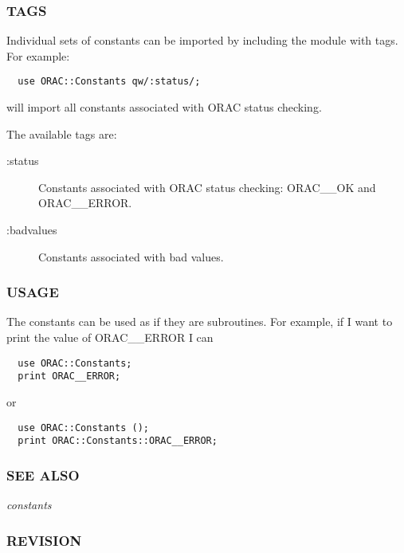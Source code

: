 \subsubsection*{TAGS\label{ORAC::Constants_TAGS}}


Individual sets of constants can be imported by
including the module with tags. For example:

\begin{verbatim}
  use ORAC::Constants qw/:status/;
\end{verbatim}


will import all constants associated with ORAC status checking.



The available tags are:

\begin{description}

\item[{:status}] \mbox{}

Constants associated with ORAC status checking: ORAC\_\_OK and ORAC\_\_ERROR.


\item[{:badvalues}] \mbox{}

Constants associated with bad values.

\end{description}
\subsubsection*{USAGE\label{ORAC::Constants_USAGE}}


The constants can be used as if they are subroutines.
For example, if I want to print the value of ORAC\_\_ERROR I can

\begin{verbatim}
  use ORAC::Constants;
  print ORAC__ERROR;
\end{verbatim}


or

\begin{verbatim}
  use ORAC::Constants ();
  print ORAC::Constants::ORAC__ERROR;
\end{verbatim}
\subsubsection*{SEE ALSO\label{ORAC::Constants_SEE_ALSO}}


\emph{constants}

\subsubsection*{REVISION\label{ORAC::Constants_REVISION}}


